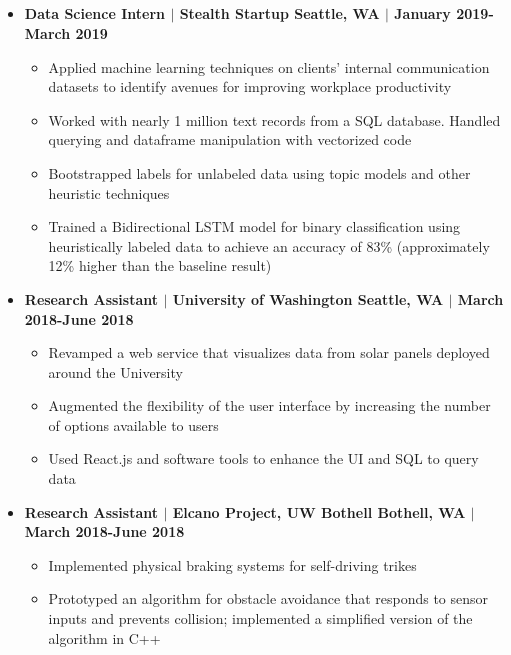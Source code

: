 \documentclass[10pt]{article}
\newcommand{\work}[4]{\textbf{#2 $|$ #1 \hfill #3 $|$ #4}}
\begin{document}
\begin{spacing}{0.3}
\section*{\color{crimson}{Relevant Experience}}
\begin{itemize}
\setlength\itemsep{0.1em}
    \item \work{Stealth Startup}{Data Science Intern}{Seattle, WA}{January 2019-March 2019}
    \begin{itemize}
        \item Applied machine learning techniques on clients' internal communication datasets to identify avenues for improving workplace productivity
        \item Worked with nearly 1 million text records from a SQL database. Handled querying and dataframe manipulation with vectorized code
        \item Bootstrapped labels for unlabeled data using topic models and other heuristic techniques
        \item Trained a Bidirectional LSTM model for binary classification using heuristically labeled data to achieve an accuracy of 83\% (approximately 12\% higher than the baseline result)
    \end{itemize}
    \item \work{University of Washington}{Research Assistant}{Seattle, WA}{March 2018-June 2018}
    \begin{itemize}
        \item Revamped a web service that visualizes data from solar panels deployed around the University
        \item Augmented the flexibility of the user interface by increasing the number of options available to users
        \item Used React.js and software tools to enhance the UI and SQL to query data
    \end{itemize}
    \item \work{Elcano Project, UW Bothell}{Research Assistant}{Bothell, WA}{March 2018-June 2018}
    \begin{itemize}
        \item Implemented physical braking systems for self-driving trikes
        \item Prototyped an algorithm for obstacle avoidance that responds to sensor inputs and prevents collision; implemented a simplified version of the algorithm in C++
    \end{itemize}
\end{itemize}

\end{spacing}
\end{document}
